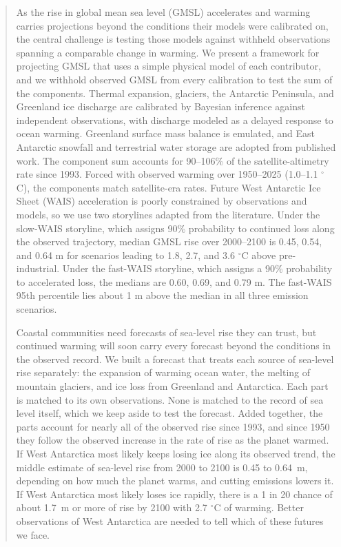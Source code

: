 \documentclass[draft,linenumbers]{agujournal2025}
\begin{document}
\begin{abstract}
As the rise in global mean sea level (GMSL) accelerates and warming carries projections beyond the conditions their models were calibrated on, the central challenge is testing those models against withheld observations spanning a comparable change in warming. We present a framework for projecting GMSL that uses a simple physical model of each contributor, and we withhold observed GMSL from every calibration to test the sum of the components. Thermal expansion, glaciers, the Antarctic Peninsula, and Greenland ice discharge are calibrated by Bayesian inference against independent observations, with discharge modeled as a delayed response to ocean warming. Greenland surface mass balance is emulated, and East Antarctic snowfall and terrestrial water storage are adopted from published work. The component sum accounts for 90--106\% of the satellite-altimetry rate since 1993. Forced with observed warming over 1950--2025 (1.0--1.1 $^\circ$C), the components match satellite-era rates. Future West Antarctic Ice Sheet (WAIS) acceleration is poorly constrained by observations and models, so we use two storylines adapted from the literature. Under the slow-WAIS storyline, which assigns 90\% probability to continued loss along the observed trajectory, median GMSL rise over 2000--2100 is 0.45, 0.54, and 0.64 m for scenarios leading to 1.8, 2.7, and 3.6 $^\circ$C above pre-industrial. Under the fast-WAIS storyline, which assigns a 90\% probability to accelerated loss, the medians are 0.60, 0.69, and 0.79 m. The fast-WAIS 95th percentile lies about 1 m above the median in all three emission scenarios.

\begin{plainlanguagesummary}
Coastal communities need forecasts of sea-level rise they can trust, but continued warming will soon carry every forecast beyond the conditions in the observed record. We built a forecast that treats each source of sea-level rise separately: the expansion of warming ocean water, the melting of mountain glaciers, and ice loss from Greenland and Antarctica. Each part is matched to its own observations. None is matched to the record of sea level itself, which we keep aside to test the forecast. Added together, the parts account for nearly all of the observed rise since 1993, and since 1950 they follow the observed increase in the rate of rise as the planet warmed. If West Antarctica most likely keeps losing ice along its observed trend, the middle estimate of sea-level rise from 2000 to 2100 is 0.45 to 0.64~m, depending on how much the planet warms, and cutting emissions lowers it. If West Antarctica most likely loses ice rapidly, there is a 1 in 20 chance of about 1.7~m or more of rise by 2100 with 2.7 $^\circ$C of warming. Better observations of West Antarctica are needed to tell which of these futures we face.
\end{plainlanguagesummary}
\end{abstract}
\end{document}
